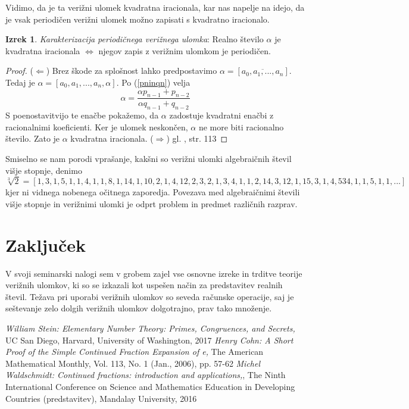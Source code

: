 \documentclass[a4paper,12pt]{article}
\theoremstyle{definition}
\theoremstyle{proposition}
\theoremstyle{theorem}
\newtheorem{iz}{Izrek}[section]
\theoremstyle{lemma}
\begin{document}
Vidimo, da je ta verižni ulomek kvadratna iracionala, kar nas napelje na idejo, da je vsak periodičen verižni ulomek možno zapisati s kvadratno iracionalo.

\begin{iz}
\label{periodicni}
\textit{Karakterizacija periodičnega verižnega ulomka}: Realno število $\alpha$ je kvadratna iracionala $\Leftrightarrow$ njegov zapis z verižnim ulomkom je periodičen.
\end{iz}
\begin{proof}
($\Leftarrow$) Brez škode za splošnost lahko predpostavimo $\alpha = [\overline{a_0, a_1, ..., a_n}]$. Tedaj je $\alpha = [a_0, a_1, ..., a_n, \alpha]$. Po (\ref{pninqn}) velja \[ \alpha = \frac{\alpha p_{n-1} + p_{n-2}}{\alpha q_{n-1} + q_{n-2}} \]
S poenostavitvijo te enačbe pokažemo, da $\alpha$ zadostuje kvadratni enačbi z racionalnimi koeficienti. Ker je ulomek neskončen, $\alpha$ ne more biti racionalno število. Zato je $\alpha$ kvadratna iracionala.
($\Rightarrow$) gl. \cite{teorijastevil}, str. 113
\end{proof}

Smiselno se nam porodi vprašanje, kakšni so verižni ulomki algebraičnih števil višje stopnje, denimo $$\sqrt[3]{2} =[1, 3, 1, 5, 1, 1, 4, 1, 1, 8, 1, 14, 1, 10, 2, 1, 4, 12, 2, 3, 2, 1, 3, 4, 1, 1, 2, 14,
3, 12, 1, 15, 3, 1, 4, 534, 1, 1, 5, 1, 1,...]$$
kjer ni vidnega nobenega očitnega zaporedja. Povezava med algebraičnimi števili višje stopnje in verižnimi ulomki je odprt problem in predmet različnih razprav.

\section{Zaključek}

V svoji seminarski nalogi sem v grobem zajel vse osnovne izreke in trditve teorije verižnih ulomkov, ki so se izkazali kot uspešen način za predstavitev realnih števil. Težava pri uporabi verižnih ulomkov so seveda računske operacije, saj je seštevanje zelo dolgih verižnih ulomkov dolgotrajno, prav tako množenje.\\

\begin{thebibliography}{5}
\textit{William Stein: Elementary Number Theory:
Primes, Congruences, and Secrets,} UC San Diego, Harvard, University of Washington, 2017
\textit{Henry Cohn: A Short Proof of the Simple Continued Fraction Expansion of e,} The American Mathematical Monthly, Vol. 113, No. 1 (Jan., 2006), pp. 57-62
\textit{Michel Waldschmidt: Continued fractions:
introduction and applications,}, The Ninth International Conference on
Science and Mathematics Education in Developing Countries (predstavitev), Mandalay University, 2016
\end{thebibliography}
\end{document}
